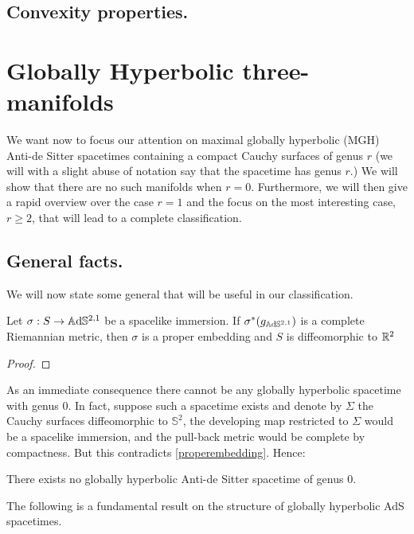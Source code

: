 \subsection{Convexity properties.}

\section{Globally Hyperbolic three-manifolds}
We want now to focus our attention on maximal globally hyperbolic (MGH) Anti-de Sitter spacetimes containing a compact Cauchy surfaces of genus $r$ (we will with a slight abuse of notation say that the spacetime has genus $r$.) We will show that there are no such manifolds when $r=0$. Furthermore, we will then give a rapid overview over the case $r=1$ and the focus on the most interesting case, $r\geq 2$, that will lead to a complete classification.

\subsection{General facts.} We will now state some general that will be useful in our classification.

\begin{lemma}\label{properembedding}
    Let $\sigma:S\to\mathbb{A}\mathrm{d}\mathbb{S}^{2,1}$ be a spacelike immersion. If $\sigma^*(g_{\mathbb{A}\mathrm{d}\mathbb{S}^{2,1}})$ is a complete Riemannian metric, then $\sigma$ is a proper embedding and $S$ is diffeomorphic to $\mathbb{R}^2$
\end{lemma}
\begin{proof}
    
\end{proof}

As an immediate consequence there cannot be any globally hyperbolic spacetime with genus $0$. In fact, suppose such a spacetime exists and denote by $\Sigma$ the Cauchy surfaces diffeomorphic to $\mathbb{S}^2$, the developing map restricted to $\Sigma$ would be a spacelike immersion, and the pull-back metric would be complete by compactness. But this contradicts \ref{properembedding}. Hence: 

\begin{corollary}
    There exists no globally hyperbolic Anti-de Sitter spacetime of genus 0. 
\end{corollary}

The following is a fundamental result on the structure of globally hyperbolic AdS spacetimes.

